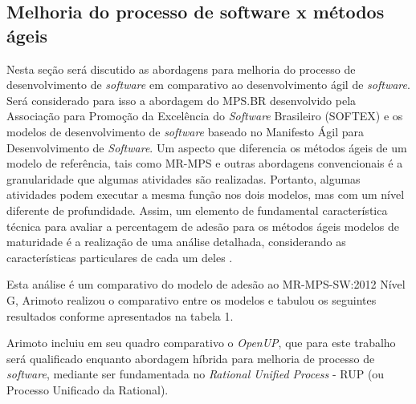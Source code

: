 \documentclass{acm_proc_article-sp}
\begin{document}
\subsection{Melhoria do processo de software x métodos ágeis}
Nesta seção será discutido as abordagens para melhoria do processo de desenvolvimento de \textit{software} em comparativo ao desenvolvimento ágil de \textit{software}. Será considerado para isso a abordagem do MPS.BR desenvolvido pela Associação para Promoção da Excelência do \textit{Software} Brasileiro (SOFTEX) e os modelos de desenvolvimento de \textit{software} baseado no Manifesto Ágil para Desenvolvimento de \textit{Software}. Um aspecto que diferencia os métodos ágeis de um modelo de referência, tais como MR-MPS e
outras abordagens convencionais é a granularidade que algumas atividades são realizadas. Portanto, algumas atividades podem executar a mesma função nos dois modelos, mas com um nível diferente de profundidade. Assim, um elemento de fundamental
característica técnica para avaliar a percentagem de adesão para os métodos ágeis modelos de maturidade é a realização de uma análise detalhada, considerando as características particulares de cada um deles \cite{Arimoto:melhoria}.  

Esta análise é um comparativo do modelo de adesão ao MR-MPS-SW:2012 Nível G, Arimoto \cite{Arimoto:melhoria} realizou o comparativo entre os modelos e tabulou os seguintes resultados conforme apresentados na tabela 1.

Arimoto \cite{Arimoto:melhoria} incluiu em seu quadro comparativo o \textit{OpenUP}, que para este trabalho será qualificado enquanto abordagem híbrida para melhoria de processo de \textit{software}, mediante ser fundamentada no \textit{Rational Unified Process} - RUP (ou Processo Unificado da Rational).
\end{document}
